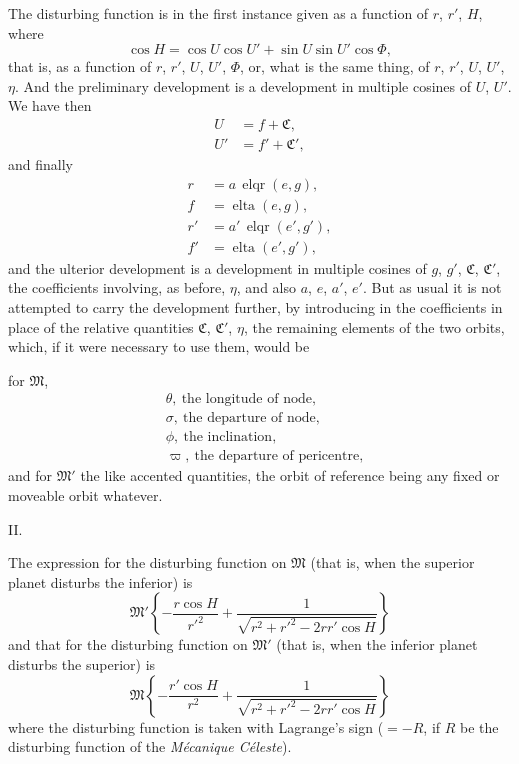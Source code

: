 \documentclass[12pt,a4paper]{article}
\providecommand{\elqr}{\mathop{\mathrm{elqr}}}
\providecommand{\elta}{\mathop{\mathrm{elta}}}
\theoremstyle{plain}
\begin{document}
The disturbing function is in the first instance given as a function of $r$, $r'$, $H$, where
\[
\cos H=\cos U\cos U'+\sin U\sin U'\cos\Phi,
\]
that is, as a function of $r$, $r'$, $U$, $U'$, $\Phi$, or, what is the same thing, of $r$, $r'$, $U$, $U'$, $\eta$. And the preliminary development is a development in multiple cosines of $U$, $U'$. We have then
\begin{align*}
U &= f+\mathfrak{C},\\
U' &= f'+\mathfrak{C}',
\end{align*}
and finally
\begin{align*}
r &= a\,\elqr(e,g),\\
f &= \elta(e,g),\\
r' &= a'\,\elqr(e',g'),\\
f' &= \elta(e',g'),
\end{align*}
and the ulterior development is a development in multiple cosines of $g$, $g'$, $\mathfrak{C}$, $\mathfrak{C}'$, the coefficients involving, as before, $\eta$, and also $a$, $e$, $a'$, $e'$. But as usual it is not attempted to carry the development further, by introducing in the coefficients in place of the relative quantities $\mathfrak{C}$, $\mathfrak{C}'$, $\eta$, the remaining elements of the two orbits, which, if it were necessary to use them, would be

for $\mathfrak{M}$,
\begin{align*}
&\theta,\ \text{the longitude of node},\\
&\sigma,\ \text{the departure of node},\\
&\phi,\ \text{the inclination},\\
&\varpi,\ \text{the departure of pericentre},
\end{align*}
and for $\mathfrak{M}'$ the like accented quantities, the orbit of reference being any fixed or moveable orbit whatever.

\newpage
{}

\begin{center}\textsc{II.}\end{center}

The expression for the disturbing function on $\mathfrak{M}$ (that is, when the superior planet disturbs the inferior) is
\[
\mathfrak{M}'\left\{-\frac{r\cos H}{r'^{2}}+\frac{1}{\sqrt{r^{2}+r'^{2}-2rr'\cos H}}\right\}
\]
and that for the disturbing function on $\mathfrak{M}'$ (that is, when the inferior planet disturbs the superior) is
\[
\mathfrak{M}\left\{-\frac{r'\cos H}{r^{2}}+\frac{1}{\sqrt{r^{2}+r'^{2}-2rr'\cos H}}\right\}
\]
where the disturbing function is taken with Lagrange's sign ($=-R$, if $R$ be the disturbing function of the \textit{M\'ecanique C\'eleste}).
\end{document}
